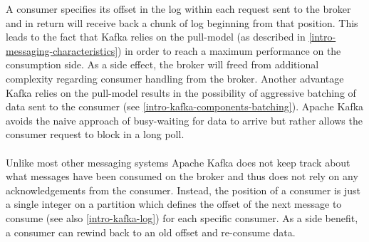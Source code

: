 A consumer specifies its offset in the log within each request sent to the
broker and in return will receive back a chunk of log beginning from that
position. This leads to the fact that Kafka relies on the pull-model (as
described in \ref{intro-messaging-characteristics}) in order to reach a maximum
performance on the consumption side. As a side effect, the broker will freed
from additional complexity regarding consumer handling from the broker. Another
advantage Kafka relies on the pull-model results in the possibility of
aggressive batching of data sent to the consumer (see
\ref{intro-kafka-components-batching}). Apache Kafka avoids the naive approach
of busy-waiting for data to arrive but rather allows the consumer request to
block in a \gls{long poll}.
\\ \\
Unlike most other messaging systems Apache Kafka does not keep track about what
messages have been consumed on the broker and thus does not rely on any
acknowledgements from the consumer. Instead, the position of a consumer is just
a single integer on a partition which defines the offset of the next message to
consume (see also \ref{intro-kafka-log}) for each specific consumer. As a side
benefit, a consumer can rewind back to an old offset and re-consume data.
\cite{apachekafka}



